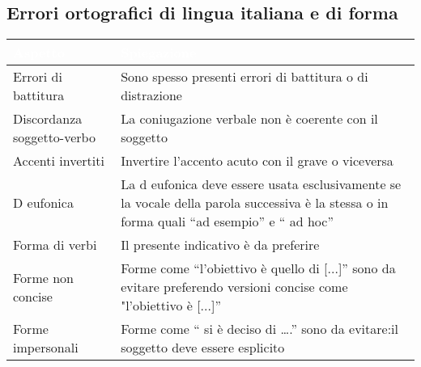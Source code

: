 \subsection{Errori ortografici di lingua italiana e di forma}
{
    \setlength{\freewidth}{\dimexpr\textwidth-10\tabcolsep}
    \renewcommand{\arraystretch}{1.5}
    \centering
    \setlength{\aboverulesep}{0pt}
    \setlength{\belowrulesep}{0pt}
    \begin{longtable}{C{.5\freewidth} C{.5\freewidth}}
       \toprule
    \textcolor{white}{\textbf{Aspetto}}&
    \textcolor{white}{\textbf{Spiegazione}}\\
    \toprule
    \endhead

    Errori di battitura & Sono spesso presenti errori di battitura o di distrazione \\
    Discordanza soggetto-verbo & La coniugazione verbale non è coerente con il soggetto \\
    Accenti invertiti & Invertire l'accento acuto con il grave o viceversa \\
    D eufonica & La d eufonica deve essere usata esclusivamente se la vocale della parola successiva è la stessa o in forma quali “ad esempio” e “ ad hoc” \\
    Forma di verbi & Il presente indicativo è da preferire \\
    Forme non concise & Forme come “l'obiettivo è quello di [...]” sono da evitare preferendo versioni concise come "l'obiettivo è [...]”\\
    Forme impersonali & Forme come “ si è deciso di ….” sono da evitare:il soggetto deve essere esplicito \\  
    
    \bottomrule
\end{longtable}
}

\newpage

